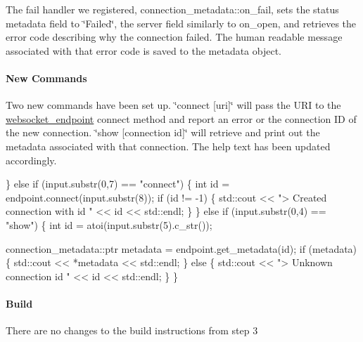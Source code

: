 The fail handler we registered, {\ttfamily connection\+\_\+metadata\+::on\+\_\+fail}, sets the status metadata field to \char`\"{}\+Failed\char`\"{}, the server field similarly to {\ttfamily on\+\_\+open}, and retrieves the error code describing why the connection failed. The human readable message associated with that error code is saved to the metadata object.

\paragraph*{New Commands}

Two new commands have been set up. \char`\"{}connect \mbox{[}uri\mbox{]}\char`\"{} will pass the U\+RI to the {\ttfamily \hyperlink{classwebsocket__endpoint}{websocket\+\_\+endpoint}} connect method and report an error or the connection ID of the new connection. \char`\"{}show \mbox{[}connection id\mbox{]}\char`\"{} will retrieve and print out the metadata associated with that connection. The help text has been updated accordingly.


\begin{DoxyCode}
\} \textcolor{keywordflow}{else} \textcolor{keywordflow}{if} (input.substr(0,7) == \textcolor{stringliteral}{"connect"}) \{
    \textcolor{keywordtype}{int} \textcolor{keywordtype}{id} = endpoint.connect(input.substr(8));
    \textcolor{keywordflow}{if} (\textcolor{keywordtype}{id} != -1) \{
        std::cout << \textcolor{stringliteral}{"> Created connection with id "} << \textcolor{keywordtype}{id} << std::endl;
    \}
\} \textcolor{keywordflow}{else} \textcolor{keywordflow}{if} (input.substr(0,4) == \textcolor{stringliteral}{"show"}) \{
    \textcolor{keywordtype}{int} \textcolor{keywordtype}{id} = atoi(input.substr(5).c\_str());

    connection\_metadata::ptr metadata = endpoint.get\_metadata(\textcolor{keywordtype}{id});
    \textcolor{keywordflow}{if} (metadata) \{
        std::cout << *metadata << std::endl;
    \} \textcolor{keywordflow}{else} \{
        std::cout << \textcolor{stringliteral}{"> Unknown connection id "} << \textcolor{keywordtype}{id} << std::endl;
    \}
\}
\end{DoxyCode}


\paragraph*{Build}

There are no changes to the build instructions from step 3

